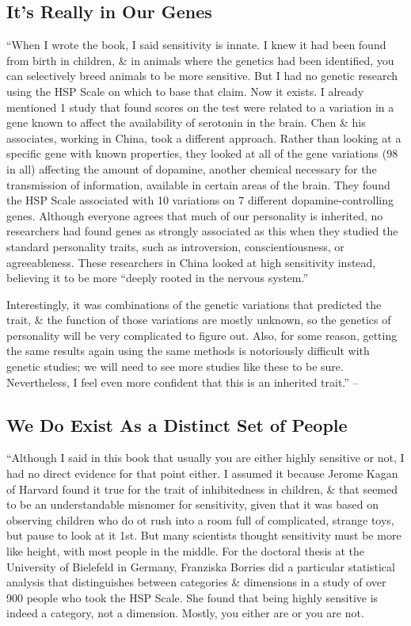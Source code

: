 \documentclass{article}
\numberwithin{equation}{section}
\begin{document}
\subsection*{It's Really in Our Genes}
``When I wrote the book, I said sensitivity is innate. I knew it had been found from birth in children, \& in animals where the genetics had been identified, you can selectively breed animals to be more sensitive. But I had no genetic research using the HSP Scale on which to base that claim. Now it exists. I already mentioned 1 study that found scores on the test were related to a variation in a gene known to affect the availability of serotonin in the brain. Chen \& his associates, working in China, took a different approach. Rather than looking at a specific gene with known properties, they looked at all of the gene variations (98 in all) affecting the amount of dopamine, another chemical necessary for the transmission of information, available in certain areas of the brain. They found the HSP Scale associated with 10 variations on 7 different dopamine-controlling genes. Although everyone agrees that much of our personality is inherited, no researchers had found genes as strongly associated as this when they studied the standard personality traits, such as introversion, conscientiousness, or agreeableness. These researchers in China looked at high sensitivity instead, believing it to be more ``deeply rooted in the nervous system.''

Interestingly, it was combinations of the genetic variations that predicted the trait, \& the function of those variations are mostly unknown, so the genetics of personality will be very complicated to figure out. Also, for some reason, getting the same results again using the same methods is notoriously difficult with genetic studies; we will need to see more studies like these to be sure. Nevertheless, I feel even more confident that this is an inherited trait.'' -- \cite[pp. 16--17]{Aron2013}

\subsection*{We Do Exist As a Distinct Set of People}
``Although I said in this book that usually you are either highly sensitive or not, I had no direct evidence for that point either. I assumed it because Jerome Kagan of Harvard found it true for the trait of inhibitedness in children, \& that seemed to be an understandable misnomer for sensitivity, given that it was based on observing children who do ot rush into a room full of complicated, strange toys, but pause to look at it 1st. But many scientists thought sensitivity must be more like height, with most people in the middle. For the doctoral thesis at the University of Bielefeld in Germany, Franziska Borries did a particular statistical analysis that distinguishes between categories \& dimensions in a study of over 900 people who took the HSP Scale. She found that being highly sensitive is indeed a category, not a dimension. Mostly, you either are or you are not.
\end{document}
